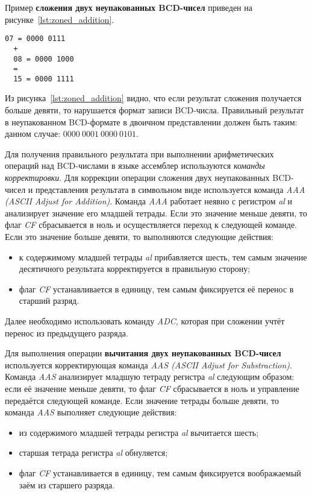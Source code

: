 \pagebreak

Пример \textbf{сложения двух неупакованных BCD-чисел} приведен на рисунке~\ref{lst:zoned_addition}.

\begin{lstlisting}[caption=Пример сложения двух неупакованных BCD-чисел,label=lst:zoned_addition,
  basicstyle=\scriptsize\ttfamily]
  07 = 0000 0111
  +
  08 = 0000 1000
  =
  15 = 0000 1111
\end{lstlisting}

Из рисунка~\ref{lst:zoned_addition} видно, что если результат сложения получается больше
девяти, то нарушается формат записи BCD-числа. Правильный результат в неупакованном
BCD-формате в двоичном представлении должен быть таким: данном случае:
$ 0000~0001~0000~0101 $.

Для получения правильного результата при выполнении арифметических операций над BCD-числами
в языке ассемблер используются \textit{команды корректировки}. Для коррекции операции сложения
двух неупакованных BCD-чисел и представления результата в символьном виде используется
команда \textit{AAA (ASCII Adjust for Addition)}. Команда \textit{AAA} работает неявно
с регистром \textit{al} и анализирует значение его младшей тетрады.
Если это значение меньше девяти, то флаг \textit{CF} сбрасывается в ноль и
осуществляется переход к следующей команде. Если это значение больше девяти, то
выполняются следующие действия:
\begin{itemize}
  \item к содержимому младшей тетрады \textit{al} прибавляется шесть, тем самым значение
  десятичного результата корректируется в правильную сторону;
  \item флаг \textit{CF} устанавливается в единицу, тем самым фиксируется её
  перенос в старший разряд.
\end{itemize}

Далее необходимо использовать команду \textit{ADC}, которая при сложении учтёт перенос
из предыдущего разряда.

Для выполнения операции \textbf{вычитания двух неупакованных BCD-чисел} используется
корректирующая команда \textit{AAS (ASCII Adjust for Substraction)}. Команда \textit{AAS}
анализирует младшую тетраду регистра \textit{al} следующим образом: если её значение
меньше девяти, то флаг \textit{CF} сбрасывается в ноль и управление передаётся
следующей команде. Если значение тетрады больше девяти, то команда \textit{AAS}
выполняет следующие действия:
\begin{itemize}
  \item из содержимого младшей тетрады регистра \textit{al} вычитается шесть;
  \item старшая тетрада регистра \textit{al} обнуляется;
  \item флаг \textit{CF} устанавливается в единицу, тем самым фиксируется воображаемый
  заём из старшего разряда.
\end{itemize}

